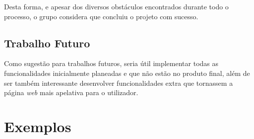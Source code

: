 \documentclass[11pt,a4paper]{report}
\begin{document}
Desta forma, e apesar dos diversos obstáculos encontrados durante todo o processo, o grupo considera que concluiu o projeto com sucesso.

\section{Trabalho Futuro}

Como sugestão para trabalhos futuros, seria útil implementar todas as funcionalidades inicialmente planeadas e que não estão no produto final, além de ser também interessante desenvolver funcionalidades extra que tornassem a página \emph{web} mais apelativa para o utilizador.

\appendix
\chapter{Exemplos}
\end{document}
